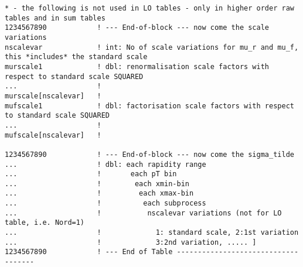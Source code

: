 {\begin{verbatim}
* - the following is not used in LO tables - only in higher order raw tables and in sum tables
1234567890            ! --- End-of-block --- now come the scale variations
nscalevar             ! int: No of scale variations for mu_r and mu_f, this *includes* the standard scale
murscale1             ! dbl: renormalisation scale factors with respect to standard scale SQUARED
...                   !
murscale[nscalevar]   !
mufscale1             ! dbl: factorisation scale factors with respect to standard scale SQUARED
...                   !
mufscale[nscalevar]   ! 

1234567890            ! --- End-of-block --- now come the sigma_tilde
...                   ! dbl: each rapidity range
...                   !       each pT bin
...                   !        each xmin-bin
...                   !         each xmax-bin
...                   !          each subprocess
...                   !           nscalevar variations (not for LO table, i.e. Nord=1)
...                   !             1: standard scale, 2:1st variation
...                   !             3:2nd variation, ..... ]
1234567890            ! --- End of Table ------------------------------------
\end{verbatim}
}



